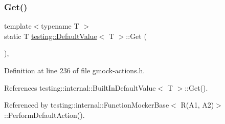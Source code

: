 \subsubsection{\texorpdfstring{Get()}{Get()}}
{\footnotesize\ttfamily template$<$typename T $>$ \\
static T \hyperlink{classtesting_1_1DefaultValue}{testing\+::\+Default\+Value}$<$ T $>$\+::Get (\begin{DoxyParamCaption}{ }\end{DoxyParamCaption})\hspace{0.3cm}{\ttfamily [inline]}, {\ttfamily [static]}}



Definition at line 236 of file gmock-\/actions.\+h.



References testing\+::internal\+::\+Built\+In\+Default\+Value$<$ T $>$\+::\+Get().



Referenced by testing\+::internal\+::\+Function\+Mocker\+Base$<$ R(\+A1, A2)$>$\+::\+Perform\+Default\+Action().


